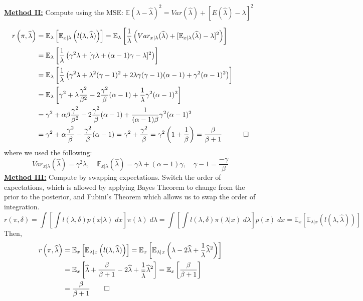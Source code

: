 \documentclass[11pt]{report}
\begin{document}
\underline{\textbf{Method II:}} Compute using the MSE: $\mathbb{E}(\lambda-\widehat{\lambda})^2 = Var(\widehat{\lambda}) + [E(\widehat{\lambda}) -\lambda]^2$ 

		\begin{align*}
		r\left(\pi, \widehat{\lambda}\right)
		& = \mathbb{E}_\lambda\left[\mathbb{E}_{x|\lambda}\left(l(\lambda, \widehat{\lambda})\right) \right] 
     = \mathbb{E}_\lambda\left[\frac{1}{\lambda}\left(Var_{x|\lambda}(\widehat{\lambda}) + [\mathbb{E}_{x|\lambda}(\widehat{\lambda}) -\lambda]^2 \right) \right] \\
    & = \mathbb{E}_\lambda\left[\frac{1}{\lambda}\left(\gamma^2\lambda + [\gamma\lambda + (\alpha-1)\gamma-\lambda]^2 \right) \right] \\
    & = \mathbb{E}_\lambda\left[\frac{1}{\lambda}\left(\gamma^2\lambda + \lambda^2(\gamma-1)^2 + 2\lambda\gamma(\gamma-1)(\alpha-1) + \gamma^2(\alpha-1)^2 \right) \right] \\
		& = \mathbb{E}_\lambda\left[\gamma^2 + \lambda\frac{\gamma^2}{\beta^2} - 2\frac{\gamma^2}{\beta}(\alpha-1) + \frac{1}{\lambda}\gamma^2(\alpha-1)^2  \right] \\ 		
		& = \gamma^2 + \alpha\beta\frac{\gamma^2}{\beta^2} - 2\frac{\gamma^2}{\beta}(\alpha-1) + \frac{1}{(\alpha-1)\beta}\gamma^2(\alpha-1)^2 \\   
	  & = \gamma^2 + \alpha\frac{\gamma^2}{\beta} - \frac{\gamma^2}{\beta}(\alpha-1)   		
		  = \gamma^2  + \frac{\gamma^2}{\beta}   		
		  = \gamma^2\left(1  + \frac{1}{\beta}\right)   	
		  = \frac{\beta}{\beta+1} \quad \qed 
		\end{align*}
		where we used the following:
		$$Var_{x|\lambda}(\widehat{\lambda}) = \gamma^2\lambda, \quad  \mathbb{E}_{x|\lambda}(\widehat{\lambda}) = \gamma\lambda +(\alpha-1)\gamma, \quad \gamma-1 = \frac{-\gamma}{\beta} $$
\underline{\textbf{Method III:}} Compute by swapping expectations. \newline
Switch the order of expectations, which is allowed by applying Bayes Theorem to change from the prior to the posterior, and Fubini's Theorem which allows us to swap the order of integration.   
		$$r(\pi, \delta) =  \int\left[ \int l(\lambda,\delta)p(x|\lambda) \;dx\right] \pi(\lambda)\; d\lambda = \int\left[ \int l(\lambda,\delta)\pi(\lambda|x) \;d\lambda\right] p(x)\; dx =  \mathbb{E}_x\left[\mathbb{E}_{\lambda|x}\left(l(\lambda, \widehat{\lambda})\right) \right]$$
Then, 
\begin{align*}
		r\left(\pi, \widehat{\lambda}\right)
		& = \mathbb{E}_x\left[\mathbb{E}_{\lambda|x}\left(l(\lambda, \widehat{\lambda})\right) \right] 
		  = \mathbb{E}_x\left[\mathbb{E}_{\lambda|x}\left(\lambda - 2\widehat{\lambda} + \frac{1}{\lambda}\widehat{\lambda}^2 \right) \right] \\
		& = \mathbb{E}_x\left[\widehat{\lambda} + \frac{\beta}{\beta+1} - 2\widehat{\lambda} + \frac{1}{\widehat{\lambda}}\widehat{\lambda}^2  \right] 
		  = \mathbb{E}_x\left[\frac{\beta}{\beta+1}  \right] \\
		& = \frac{\beta}{\beta+1}  \qed
\end{align*}
\end{document}
